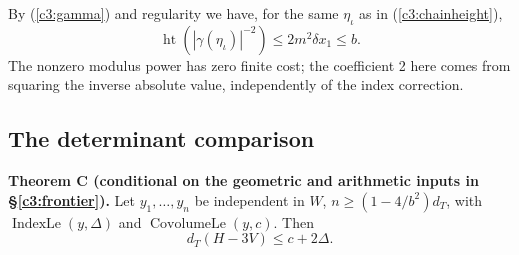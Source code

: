 By (\ref{c3:gamma}) and regularity we have, for the same
$\eta_\iota$ as in (\ref{c3:chainheight}),
\begin{equation}\label{c3:gammaheight}
 \operatorname{ht}(|\gamma(\eta_\iota)|^{-2})
 \le 2m^2\delta x_1\le b .
\end{equation}
The nonzero modulus power has zero finite cost; the coefficient 2
here comes from squaring the inverse absolute value, independently
of the index correction.

\subsection{The determinant comparison}\label{c3:compare}

\noindent\textbf{Theorem C (conditional on the geometric and arithmetic inputs
in \S\ref{c3:frontier}).}
Let $y_1,\ldots,y_n$ be independent in $W$,
$n\ge(1-4/b^2)d_T$, with $\operatorname{IndexLe}(y,\Delta)$
and $\operatorname{CovolumeLe}(y,c)$. Then
\begin{equation}\label{c3:theorem}
 d_T(H-3V)\le c+2\Delta.
\end{equation}

